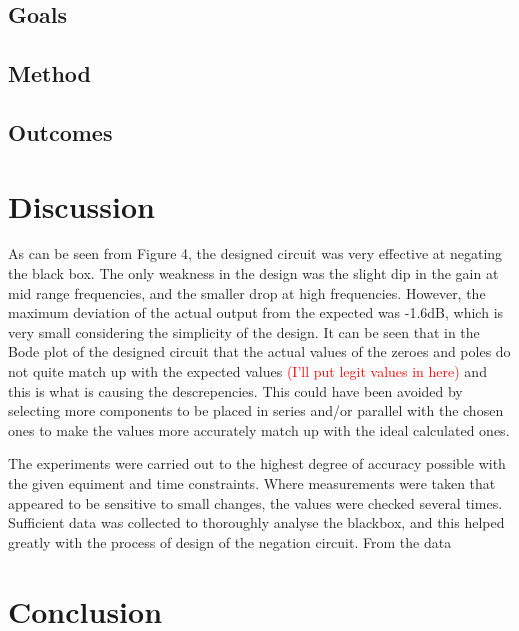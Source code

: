 \documentclass[12pt]{article} %
\begin{document}
\subsection{Goals}


\subsection{Method}


\subsection{Outcomes}
\pagebreak





\section{Discussion}

As can be seen from Figure 4, the designed circuit was very effective at negating the black box. The only weakness in the design was the slight dip in the gain at mid range frequencies, and the smaller drop at high frequencies. However, the maximum deviation of the actual output from the expected was -1.6dB, which is very small considering the simplicity of the design. It can be seen that in the Bode plot of the designed circuit that the actual values of the zeroes and poles do not quite match up with the expected values \textcolor{red}{(I'll put legit values in here)} and this is what is causing the descrepencies. This could have been avoided by selecting more components to be placed in series and/or parallel with the chosen ones to make the values more accurately match up with the ideal calculated ones.

The experiments were carried out to the highest degree of accuracy possible with the given equiment and time constraints. Where measurements were taken that appeared to be sensitive to small changes, the values were checked several times. Sufficient data was collected to thoroughly analyse the blackbox, and this helped greatly with the process of design of the negation circuit. From the data

\pagebreak





\section{Conclusion}
\pagebreak
\end{document}
